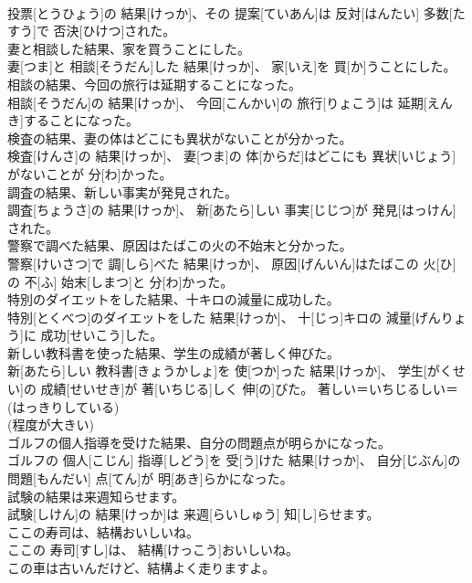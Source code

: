 \documentclass[8pt]{extreport}
\begin{document}
\begin{CJK}{UTF8}{min}
\\	投票[とうひょう]の 結果[けっか]、その 提案[ていあん]は 反対[はんたい] 多数[たすう]で 否決[ひけつ]された。	
\\	妻と相談した結果、家を買うことにした。	
\\	妻[つま]と 相談[そうだん]した 結果[けっか]、 家[いえ]を 買[か]うことにした。	
\\	相談の結果、今回の旅行は延期することになった。	
\\	相談[そうだん]の 結果[けっか]、 今回[こんかい]の 旅行[りょこう]は 延期[えんき]することになった。	
\\	検査の結果、妻の体はどこにも異状がないことが分かった。	
\\	検査[けんさ]の 結果[けっか]、 妻[つま]の 体[からだ]はどこにも 異状[いじょう]がないことが 分[わ]かった。	
\\	調査の結果、新しい事実が発見された。	
\\	調査[ちょうさ]の 結果[けっか]、 新[あたら]しい 事実[じじつ]が 発見[はっけん]された。	
\\	警察で調べた結果、原因はたばこの火の不始末と分かった。	
\\	警察[けいさつ]で 調[しら]べた 結果[けっか]、 原因[げんいん]はたばこの 火[ひ]の 不[ふ] 始末[しまつ]と 分[わ]かった。	
\\	特別のダイエットをした結果、十キロの減量に成功した。	
\\	特別[とくべつ]のダイエットをした 結果[けっか]、 十[じっ]キロの 減量[げんりょう]に 成功[せいこう]した。	
\\	新しい教科書を使った結果、学生の成績が著しく伸びた。	
\\	新[あたら]しい 教科書[きょうかしょ]を 使[つか]った 結果[けっか]、 学生[がくせい]の 成績[せいせき]が 著[いちじる]しく 伸[の]びた。	著しい＝いちじるしい＝ (はっきりしている) 
\\	(程度が大きい) 
\\	ゴルフの個人指導を受けた結果、自分の問題点が明らかになった。	
\\	ゴルフの 個人[こじん] 指導[しどう]を 受[う]けた 結果[けっか]、 自分[じぶん]の 問題[もんだい] 点[てん]が 明[あき]らかになった。	
\\	試験の結果は来週知らせます。	
\\	試験[しけん]の 結果[けっか]は 来週[らいしゅう] 知[し]らせます。	
\\	ここの寿司は、結構おいしいね。	
\\	ここの 寿司[すし]は、 結構[けっこう]おいしいね。	
\\	この車は古いんだけど、結構よく走りますよ。	

\end{CJK}
\end{document}
